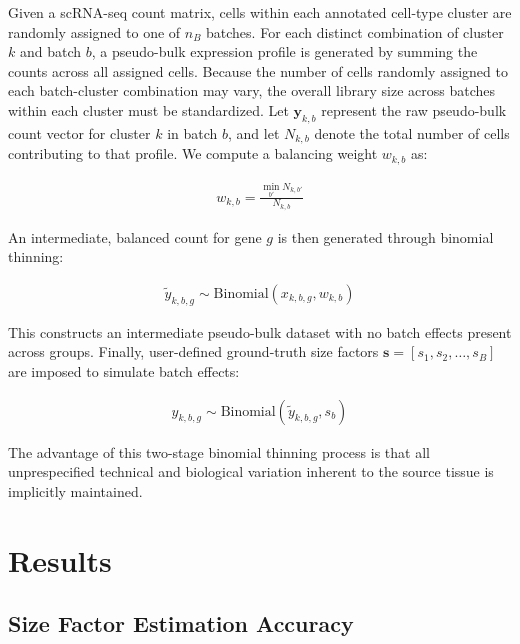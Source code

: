 \documentclass[10pt,letterpaper]{article}
\begin{document}
Given a scRNA-seq count matrix, cells within each annotated cell-type cluster are randomly assigned to one of $n_B$ batches. 
For each distinct combination of cluster $k$ and batch $b$, a pseudo-bulk expression profile is generated by summing the counts across all assigned cells. 
Because the number of cells randomly assigned to each batch-cluster combination may vary, the overall library size across batches within each cluster must be standardized. 
Let $\boldsymbol{y}_{k,b}$ represent the raw pseudo-bulk count vector for cluster $k$ in batch $b$, and let $N_{k,b}$ denote the total number of cells contributing to that profile. 
We compute a balancing weight $w_{k,b}$ as:

\begin{align}
w_{k,b} = \frac{\min_{b'} N_{k,b'}}{N_{k,b}}
\end{align}

An intermediate, balanced count for gene $g$ is then generated through binomial thinning:

\begin{align}
\tilde{y}_{k,b,g} \sim \text{Binomial}(x_{k,b,g}, w_{k,b})
\end{align}

This constructs an intermediate pseudo-bulk dataset with no batch effects present across groups. Finally, user-defined ground-truth size factors $\boldsymbol{s} = [s_1, s_2, \dots, s_B]$ are imposed to simulate batch effects:

\begin{align}
y_{k,b,g} \sim \text{Binomial}(\tilde{y}_{k,b,g}, s_b)
\end{align}

The advantage of this two-stage binomial thinning process is that all unprespecified technical and biological variation inherent to the source tissue is implicitly maintained. 

\section*{Results}
\subsection*{Size Factor Estimation Accuracy}
\end{document}
